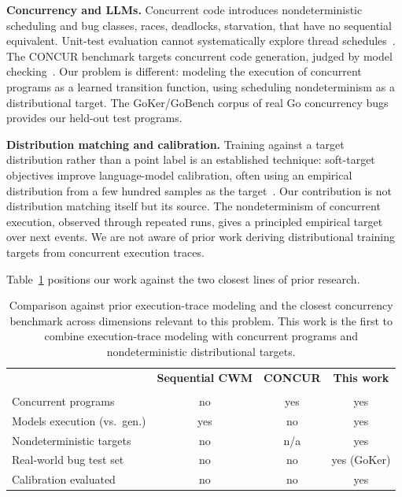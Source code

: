 \documentclass{svproc}
\begin{document}
\textbf{Concurrency and LLMs.}
Concurrent code introduces nondeterministic scheduling and bug classes,
races, deadlocks, starvation, that have no sequential equivalent.
Unit-test evaluation cannot systematically explore thread
schedules~\cite{concur}. The CONCUR benchmark targets concurrent code
generation, judged by model checking~\cite{concur}. Our problem is
different: modeling the execution of concurrent programs as a learned
transition function, using scheduling nondeterminism as a distributional
target. The GoKer/GoBench corpus of real Go concurrency
bugs~\cite{goker} provides our held-out test programs.

\textbf{Distribution matching and calibration.}
Training against a target distribution rather than a point label is an
established technique: soft-target objectives improve language-model
calibration, often using an empirical distribution from a few hundred
samples as the target~\cite{diffuse,probcalib}. Our contribution is not
distribution matching itself but its source. The nondeterminism of
concurrent execution, observed through repeated runs, gives a
principled empirical target over next events. We are not aware of prior
work deriving distributional training targets from concurrent execution
traces.

Table~\ref{tab:position} positions our work against the two closest
lines of prior research.

\begin{table}[t]
\centering
\caption{Comparison against prior execution-trace modeling and the
closest concurrency benchmark across dimensions relevant to this
problem. This work is the first to combine execution-trace modeling
with concurrent programs and nondeterministic distributional targets.}
\label{tab:position}
\small
\begin{tabular}{lccc}
\toprule
 & \textbf{Sequential CWM} & \textbf{CONCUR} & \textbf{This work}\\
 & \cite{cwm} & \cite{concur} & \\
\midrule
Concurrent programs        & no  & yes & yes\\
Models execution (vs.\ gen.) & yes & no  & yes\\
Nondeterministic targets   & no  & n/a & yes\\
Real-world bug test set    & no  & no  & yes (GoKer)\\
Calibration evaluated      & no  & no  & yes\\
\bottomrule
\end{tabular}
\end{table}
\end{document}
